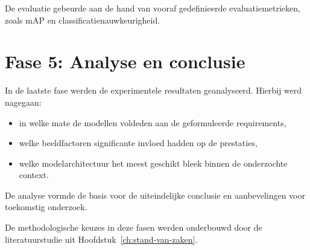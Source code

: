 De evaluatie gebeurde aan de hand van vooraf gedefinieerde evaluatiemetrieken, zoals mAP en classificatienauwkeurigheid.

\section*{Fase 5: Analyse en conclusie}

In de laatste fase werden de experimentele resultaten geanalyseerd. Hierbij werd nagegaan:

\begin{itemize}
    \item in welke mate de modellen voldeden aan de geformuleerde requirements,
    \item welke beeldfactoren significante invloed hadden op de prestaties,
    \item welke modelarchitectuur het meest geschikt bleek binnen de onderzochte context.
\end{itemize}

De analyse vormde de basis voor de uiteindelijke conclusie en aanbevelingen voor toekomstig onderzoek.

De methodologische keuzes in deze fasen werden onderbouwd door de literatuurstudie uit Hoofdstuk~\ref{ch:stand-van-zaken}.
